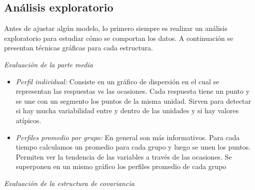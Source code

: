 \documentclass[12pt]{article}
\begin{document}
\subsection{Análisis exploratorio}

Antes de ajustar algún modelo, lo primero siempre es realizar un análisis exploratorio para estudiar cómo se comportan
los datos. A continuación se presentan técnicas gráficas para cada estructura.

\emph{Evaluación de la parte media}

\begin{itemize}
	\item \emph{Perfil individual:} Consiste en un gráfico de dispersión en el cual se representan las respuestas vs las
	ocasiones. Cada respuesta tiene un punto y se une con un segmento los puntos de la misma unidad. Sirven para detectar
	si hay mucha variabilidad entre y dentro de las unidades y si hay valores atípicos.
	\item \emph{Perfiles promedio por grupo:} En general son más informativos. Para cada tiempo calculamos un promedio
	para cada grupo y luego se unen los puntos. Permiten ver la tendencia de las variables a través de las ocasiones.
	Se superponen en un mismo gráfico los perfiles promedio de cada grupo
\end{itemize}

\emph{Evaluación de la estructura de covariancia}
\end{document}
